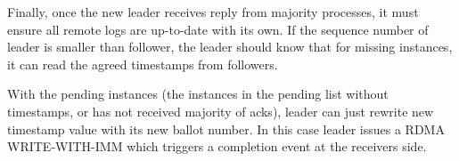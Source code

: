 Finally, once the new leader receives reply from majority processes, it must
ensure all remote logs are up-to-date with its own. If the sequence number of
leader is smaller than follower, the leader should know that for missing
instances, it can read the agreed timestamps from followers.

With the pending instances (the instances in the pending list without
timestamps, or has not received majority of acks), leader can just rewrite new
timestamp value with its new ballot number. In this case leader issues a RDMA
WRITE-WITH-IMM which triggers a completion event at the receivers side.


